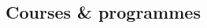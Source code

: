\documentclass[]{resume}
\begin{document}
\begin{adjustwidth}{10pt}{10pt}
\section*{Courses \& programmes}

\renewcommand{\twentylen}{\itemwidth}
\begin{twenty}[\chronowidth]
    
    
    
    
\end{twenty}


\end{adjustwidth}

\end{document}
